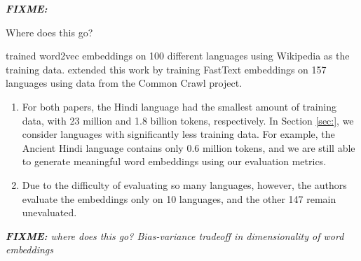 \documentclass[11pt,a4paper]{article}
\newcommand{\fixme}[1]{{\color{red}\itshape \textbf{FIXME:} {#1}}}
\begin{document}
\fixme{
Where does this go?

\citet{al2013polyglot} trained word2vec embeddings on 100 different languages using Wikipedia as the training data.
\citet{grave2018learning} extended this work by training FastText embeddings on 157 languages using data from the Common Crawl project.
\begin{enumerate}
\item
For both papers, the Hindi language had the smallest amount of training data,
with 23 million and 1.8 billion tokens, respectively.
In Section \ref{sec:}, we consider languages with significantly less training data.
For example, the Ancient Hindi language contains only 0.6 million tokens,
and we are still able to generate meaningful word embeddings using our evaluation metrics.

\item
Due to the difficulty of evaluating so many languages, however, the authors evaluate the embeddings only on 10 languages,
and the other 147 remain unevaluated.
\end{enumerate}
}


\fixme{where does this go?
Bias-variance tradeoff in dimensionality of word embeddings \cite{yin2018dimensionality}
}



%
%
%
%
%
%
%
%
\end{document}
